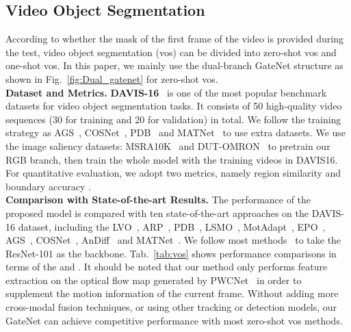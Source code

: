 \documentclass[runningheads]{llncs}
\begin{document}
	\subsection{Video Object Segmentation}
	According to whether the mask of the first frame of the video is provided during the test, video object segmentation (vos) can be divided into zero-shot vos and one-shot vos. In this paper, we mainly use the dual-branch GateNet structure as shown in Fig.~\ref{fig:Dual_gatenet} for zero-shot vos.
	\\  
	\textbf{Dataset and Metrics.}
	\textbf{DAVIS-16}~\cite{davis16} is one of the most popular benchmark datasets for video object segmentation tasks. It consists  of  50 high-quality  video  sequences (30 for training and 20 for validation) in total. We follow the training strategy as AGS~\cite{AGS}, COSNet~\cite{COSNet}, PDB~\cite{PDB} and MATNet~\cite{MATNet} to use extra datasets. We use the image saliency datasets: MSRA10K~\cite{MSRA10K} and DUT-OMRON~\cite{DUT-OMRON} to pretrain our RGB branch, then train the whole model with the training videos in DAVIS16. For quantitative evaluation, we adopt two metrics, namely region similarity  and boundary accuracy .
	\\
	\textbf{Comparison with State-of-the-art Results.}
	The performance of the proposed model is compared
	with ten state-of-the-art approaches on the DAVIS-16 dataset, including the LVO~\cite{LVO}, ARP~\cite{ARP}, PDB~\cite{PDB}, LSMO~\cite{LSMO}, MotAdapt~\cite{MotAdapt}, EPO~\cite{EPO}, AGS~\cite{AGS}, COSNet~\cite{COSNet}, AnDiff~\cite{AnDiff} and MATNet~\cite{MATNet}. We follow most methods~\cite{MATNet,AnDiff,COSNet,LSMO} to take the ResNet-101 as the backbone. Tab.~\ref{tab:vos} shows performance comparisons in terms of the  and . It should be noted that our method only performs feature extraction on the optical flow map generated by PWCNet~\cite{PWC} in order to supplement the motion information of the current frame. Without adding more cross-modal fusion techniques, or using other tracking or detection models, our GateNet can achieve competitive performance with most zero-shot vos methods.
\end{document}
